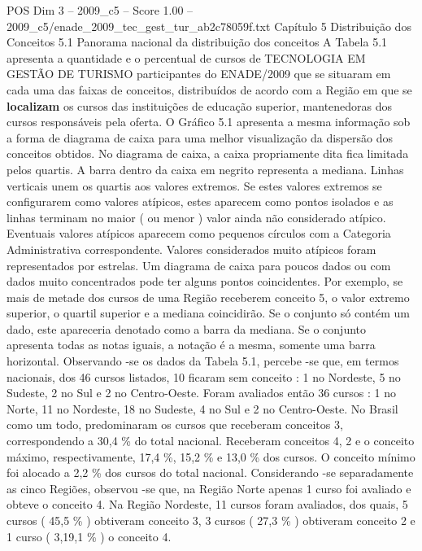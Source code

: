 \begin{textsample}{POS Dim 3 – 2009\_c5 – Score 1.00 – 2009\_c5/enade\_2009\_tec\_gest\_tur\_ab2c78059f.txt}  \label{ex:f3_pos_133}
Capítulo 5 Distribuição dos Conceitos 5.1 Panorama nacional da distribuição dos conceitos A Tabela 5.1 apresenta a quantidade e o percentual de cursos de TECNOLOGIA EM GESTÃO DE TURISMO participantes do ENADE/2009 que se situaram em cada uma das faixas de conceitos, distribuídos de acordo com a Região em que se \textbf{localizam} os cursos das instituições de educação superior, mantenedoras dos cursos responsáveis pela oferta.
O Gráfico 5.1 apresenta a mesma informação sob a forma de diagrama de caixa para uma melhor visualização da dispersão dos conceitos obtidos.
No diagrama de caixa, a caixa propriamente dita fica limitada pelos quartis.
A barra dentro da caixa em negrito representa a mediana.
Linhas verticais unem os quartis aos valores extremos.
Se estes valores extremos se configurarem como valores atípicos, estes aparecem como pontos isolados e as linhas terminam no maior ( ou menor ) valor ainda não considerado atípico.
Eventuais valores atípicos aparecem como pequenos círculos com a Categoria Administrativa correspondente.
Valores considerados muito atípicos foram representados por estrelas.
Um diagrama de caixa para poucos dados ou com dados muito concentrados pode ter alguns pontos coincidentes.
Por exemplo, se mais de metade dos cursos de uma Região receberem conceito 5, o valor extremo superior, o quartil superior e a mediana coincidirão.
Se o conjunto só contém um dado, este apareceria denotado como a barra da mediana.
Se o conjunto apresenta todas as notas iguais, a notação é a mesma, somente uma barra horizontal.
Observando -se os dados da Tabela 5.1, percebe -se que, em termos nacionais, dos 46 cursos listados, 10 ficaram sem conceito : 1 no Nordeste, 5 no Sudeste, 2 no Sul e 2 no Centro-Oeste.
Foram avaliados então 36 cursos : 1 no Norte, 11 no Nordeste, 18 no Sudeste, 4 no Sul e 2 no Centro-Oeste.
No Brasil como um todo, predominaram os cursos que receberam conceitos 3, correspondendo a 30,4 \% do total nacional.
Receberam conceitos 4, 2 e o conceito máximo, respectivamente, 17,4 \%, 15,2 \% e 13,0 \% dos cursos.
O conceito mínimo foi alocado a 2,2 \% dos cursos do total nacional.
Considerando -se separadamente as cinco Regiões, observou -se que, na Região Norte apenas 1 curso foi avaliado e obteve o conceito 4.
Na Região Nordeste, 11 cursos foram avaliados, dos quais, 5 cursos ( 45,5 \% ) obtiveram conceito 3, 3 cursos ( 27,3 \% ) obtiveram conceito 2 e 1 curso ( 3,19,1 \% ) o conceito 4.

\end{textsample}

